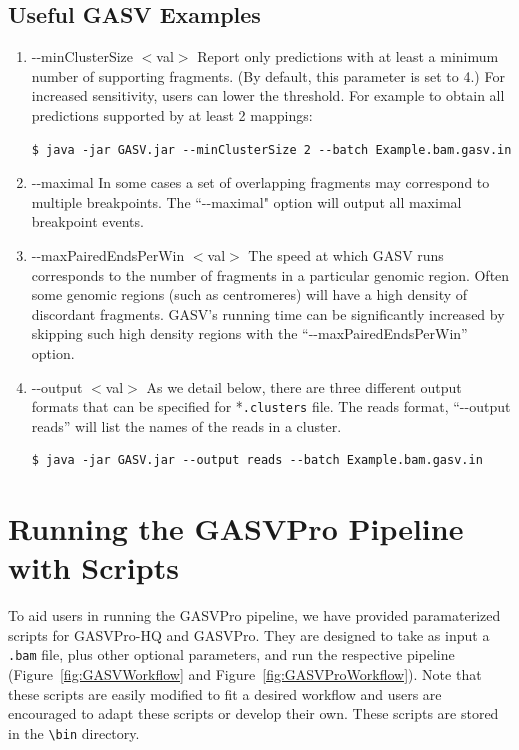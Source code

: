 \documentclass[11pt]{article}
\begin{document}
\subsection{Useful GASV Examples} 
\begin{enumerate}

\item -{}-minClusterSize $<$val$>$
Report only predictions with at least a minimum number of supporting 
fragments. (By default, this parameter is set to 4.) For increased sensitivity, users can lower the threshold. For example to obtain all predictions supported by at least 2 mappings:

\begin{framed}
{ \small
\begin{Verbatim}
$ java -jar GASV.jar --minClusterSize 2 --batch Example.bam.gasv.in
\end{Verbatim}
}
\end{framed}

\item -{}-maximal
In some cases a set of overlapping fragments may correspond to 
multiple breakpoints. The ``-{}-maximal" option will output 
all maximal breakpoint events.

\item -{}-maxPairedEndsPerWin $<$val$>$
The speed at which GASV runs corresponds to the number of fragments in 
a particular genomic region. Often some genomic regions (such as centromeres) 
will have a high density of discordant fragments. GASV's running time
can be significantly increased by skipping such high density regions with 
the ``-{}-maxPairedEndsPerWin'' option.

\item -{}-output $<$val$>$
As we detail below, there are three different output formats
that can be specified for *\verb+.clusters+ file. The reads format, ``-{}-output reads'' 
will list the names of the reads in a cluster. 

\begin{framed}
{\small
\begin{Verbatim}
$ java -jar GASV.jar --output reads --batch Example.bam.gasv.in
\end{Verbatim}
}
\end{framed}

\end{enumerate}

\clearpage

\section{Running the GASVPro Pipeline with Scripts}
\label{sec:GASVProScripts}
To aid users in running the GASVPro pipeline, we have provided paramaterized scripts for GASVPro-HQ and GASVPro. They are designed to take as input a \verb+.bam+ file, plus other optional parameters, and run the respective pipeline (Figure~\ref{fig:GASVWorkflow} and Figure~\ref{fig:GASVProWorkflow}). Note that these scripts are easily modified to fit a desired workflow and users are encouraged to adapt these scripts or develop their own. These scripts are stored in the \verb+\bin+ directory.
\end{document}
